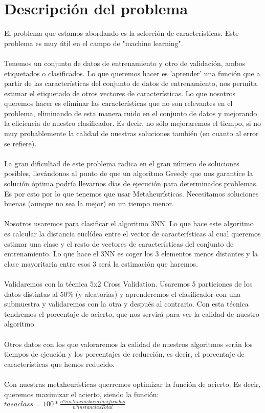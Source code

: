 	\section{Descripción del problema}
	El problema que estamos abordando es la selección de características. Este problema es muy útil en el campo de "machine learning".
	\\
	\\
	Tenemos un conjunto de datos de entrenamiento y otro de validación, ambos etiquetados o clasificados. Lo que queremos hacer es 'aprender' una función que a partir de las características del conjunto de datos de entrenamiento, nos permita estimar el etiquetado de otros vectores de características. Lo que nosotros queremos hacer es eliminar las características que no son relevantes en el problema, eliminando de esta manera ruido en el conjunto de datos y mejorando la eficiencia de nuestro clasificador. Es decir, no sólo mejoraremos el tiempo, si no muy probablemente la calidad de nuestras soluciones también (en cuanto al error se refiere).
	\\
	\\
	La gran dificultad de este problema radica en el gran número de soluciones posibles, llevándonos al punto de que un algoritmo Greedy que nos garantice la solución óptima podría llevarnos días de ejecución para determinados problemas. Es por esto por lo que tenemos que usar Metaheurísticas. Necesitamos soluciones buenas (aunque no sea la mejor) en un tiempo menor.
	\\
	\\
	Nosotros usaremos para clasificar el algoritmo 3NN. Lo que hace este algoritmo es calcular la distancia euclídea entre el vector de características al cual queremos estimar una clase y el resto de vectores de características del conjunto de entrenamiento. Lo que hace el 3NN es coger los 3 elementos menos distantes y la clase mayoritaria entre esos 3 será la estimación que haremos.
	\\
	\\
	Validaremos con la técnica 5x2 Cross Validation. Usaremos 5 particiones de los datos distintas al 50\% (y aleatorias) y aprenderemos el clasificador con una submuestra y validaremos con la otra y después al contrario. Con esta técnica tendremos el porcentaje de acierto, que nos servirá para ver la calidad de nuestro algoritmo.
	\\
	\\
	Otros datos con los que valoraremos la calidad de nuestros algoritmos serán los tiempos de ejeución y los porcentajes de reducción, es decir, el porcentaje de características que hemos reducido.
	\\
	\\
	Con nuestras metaheurísticas querremos optimizar la función de acierto. Es decir, queremos maximizar el acierto, siendo la función:\\
	$tasaclass = 100*\frac{nºinstancias bien clasificadas}{nº instancias Total}$
	
